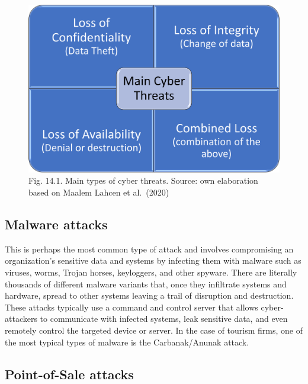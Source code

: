 \documentclass[
  letterpaper,
  DIV=11,
  numbers=noendperiod]{scrreprt}
\begin{document}
\begin{figure}

{\centering \includegraphics[width=6.25in,height=\textheight]{img/fig21.png}

}

\caption{Fig. 14.1. Main types of cyber threats. Source: own elaboration
based on Maalem Lahcen et al.~(2020)}

\end{figure}

\hypertarget{malware-attacks}{%
\subsection{Malware attacks}\label{malware-attacks}}

This is perhaps the most common type of attack and involves compromising
an organization's sensitive data and systems by infecting them with
malware such as viruses, worms, Trojan horses, keyloggers, and other
spyware. There are literally thousands of different malware variants
that, once they infiltrate systems and hardware, spread to other systems
leaving a trail of disruption and destruction. These attacks typically
use a command and control server that allows cyber-attackers to
communicate with infected systems, leak sensitive data, and even
remotely control the targeted device or server. In the case of tourism
firms, one of the most typical types of malware is the Carbanak/Anunak
attack.

\hypertarget{point-of-sale-attacks}{%
\subsection{Point-of-Sale attacks}\label{point-of-sale-attacks}}
\end{document}
